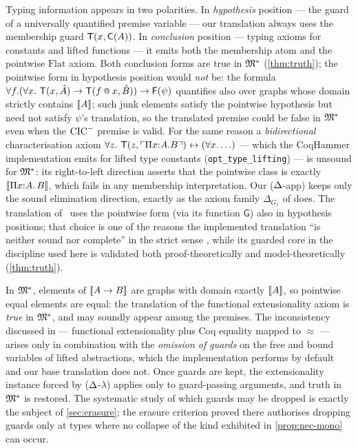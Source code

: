 \begin{remark}
\label{rem:polarity}
Typing information appears in two polarities.  In \emph{hypothesis}
position --- the guard of a universally quantified premise variable
--- our translation always uses the membership guard $\mathsf{T}(x,
\mathsf{C}(A))$.  In \emph{conclusion} position --- typing axioms for
constants and lifted functions --- it emits both the membership atom
and the pointwise $\mathrm{Flat}$ axiom.  Both conclusion forms are
true in $\mathfrak{M}^{*}$ (\cref{thm:truth}); the pointwise form in
hypothesis position would \emph{not} be: the formula
$\forall f. (\forall x.\ \hastype(x, \hat{A}) \to \hastype(f \app
x, \hat{B})) \to \trFn{\psi}$ quantifies also over graphs whose
domain strictly contains $[\![ A ]\!]$; such junk elements satisfy the
pointwise hypothesis but need not satisfy $\psi$'s translation, so
the translated premise could be false in $\mathfrak{M}^{*}$ even when the
$\mathrm{CIC}^{-}$ premise is valid.  For the same reason a
\emph{bidirectional} characterisation axiom $\forall z.\
\mathsf{T}(z, \ulcorner \Pi x{:}A.B \urcorner) \leftrightarrow (\forall x.\ldots)$
--- which the CoqHammer implementation emits for lifted type
constants (\texttt{opt\_type\_lifting}) --- is unsound for
$\mathfrak{M}^{*}$: its right-to-left direction asserts that the pointwise
class is exactly $[\![ \Pi x{:}A.\,B ]\!]$, which fails in any
membership interpretation.  Our ($\Delta$-app) keeps only the sound
elimination direction, exactly as the axiom family $\Delta_{G_1}$
of \cite[Def.~45]{Czajka2016} does.  The translation
of~\cite[\S5.2]{CzajkaKaliszyk2018} uses the pointwise form
(via its function $\mathsf{G}$) also in hypothesis positions; that
choice is one of the reasons the implemented translation ``is
neither sound nor complete'' in the strict sense
\cite[\S5.6]{CzajkaKaliszyk2018}, while its guarded core in the
discipline used here is validated both proof-theoretically
\cite{Czajka2016} and model-theoretically (\cref{thm:truth}).
\end{remark}

\begin{remark}
\label{rem:funext}
In $\mathfrak{M}^{*}$, elements of $[\![ A \to B ]\!]$ are graphs with domain
exactly $[\![ A ]\!]$, so pointwise equal elements are equal:
the translation of the functional extensionality axiom is
\emph{true} in $\mathfrak{M}^{*}$, and may soundly appear among the
premises.  The inconsistency discussed in
\cite[\S5.6]{CzajkaKaliszyk2018} --- functional extensionality
plus Coq equality mapped to $\approx$ --- arises only in
combination with the \emph{omission of guards} on the free and bound
variables of lifted abstractions, which the implementation performs
by default and our base translation does not.  Once guards are kept,
the extensionality instance forced by ($\Delta$-$\lambda$) applies only
to guard-passing arguments, and truth in $\mathfrak{M}^{*}$ is restored.
The systematic study of which guards may be dropped is exactly the
subject of \cref{sec:erasure}; the erasure criterion proved there
authorises dropping guards only at types where no collapse of the
kind exhibited in \cref{prop:nec-mono} can occur.
\end{remark}

